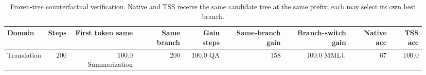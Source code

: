 \begin{table}[t]
\centering
\small
\caption{Frozen-tree counterfactual verification. Native and TSS receive the same candidate tree at the same prefix; each may select its own best branch.}
\label{tab:tss_verification_mechanism}
\begin{tabular}{lrrrrrrrr}
\toprule
Domain & Steps & First token same & Same branch & Gain steps & Same-branch gain & Branch-switch gain & Native acc & TSS acc \\
\midrule
Translation & 200 & 100.0%
Summarization & 200 & 100.0%
QA & 158 & 100.0%
MMLU & 67 & 100.0%
\bottomrule
\end{tabular}
\end{table}

